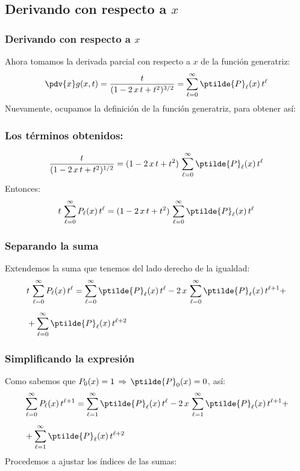 \subsection{Derivando con respecto a \texorpdfstring{$x$}{x}}
\begin{frame}
\frametitle{Derivando con respecto a $x$}
Ahora tomamos la derivada parcial con respecto a $x$ de la función generatriz:
\pause
\begin{align*}
\pdv{x} g(x, t) = \dfrac{t}{(1 - 2 \, x \, t + t^{2})^{3/2}} = \sum_{\ell=0}^{\infty} \ptilde{P}_{\ell} (x) \, t^{\ell}
\end{align*}
\pause
Nuevamente, ocupamos la definición de la función generatriz, para obtener así:
\end{frame}
\begin{frame}
\frametitle{Los términos obtenidos:}
\begin{align*}
\dfrac{t}{(1 - 2 \, x \, t + t^{2})^{1/2}} = (1 - 2 \, x \, t + t^{2}) \, \sum_{\ell=0}^{\infty} \ptilde{P}_{\ell} (x) \, t^{\ell}
\end{align*}
\pause
Entonces:
\begin{align*}
t \, \sum_{\ell=0}^{\infty} P_{\ell} (x) \, t^{\ell} = (1 - 2 \, x \, t + t^{2}) \, \sum_{\ell=0}^{\infty} \ptilde{P}_{\ell} (x) \, t^{\ell}
\end{align*}
\end{frame}
\begin{frame}
\frametitle{Separando la suma}
Extendemos la suma que tenemos del lado derecho de la igualdad:
\pause
\begin{align*}
&t \, \sum_{\ell=0}^{\infty} P_{\ell} (x) \, t^{\ell} = \sum_{\ell=0}^{\infty} \ptilde{P}_{\ell} (x) \, t^{\ell} - 2 \, x \, \sum_{\ell=0}^{\infty} \ptilde{P}_{\ell} (x) \, t^{\ell+1} + \\[0.5em]
&+ \sum_{\ell=0}^{\infty} \ptilde{P}_{\ell} (x) \, t^{\ell+2}
\end{align*}
\end{frame}
\begin{frame}
\frametitle{Simplificando la expresión}
Como sabemos que $P_{0}(x) = 1 \, \Rightarrow \, \ptilde{P}_{0}(x)= 0$, así:
\pause
\begin{align*}
&\sum_{\ell=0}^{\infty} P_{\ell} (x) \, t^{\ell+1} = \sum_{\ell=1}^{\infty} \ptilde{P}_{\ell} (x) \, t^{\ell} - 2 \, x \, \sum_{\ell=1}^{\infty} \ptilde{P}_{\ell} (x) \, t^{\ell+1} + \\[0.5em]
&+ \sum_{\ell=1}^{\infty} \ptilde{P}_{\ell} (x) \, t^{\ell+2}
\end{align*}
\pause
Procedemos a ajustar los índices de las sumas:
\end{frame}
